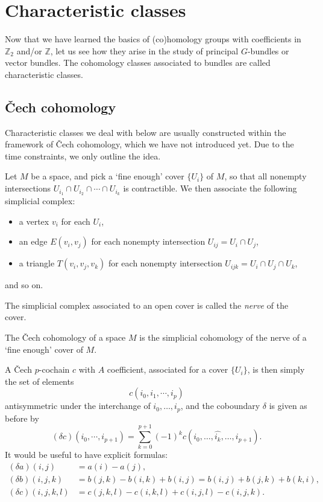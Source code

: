\documentclass[12pt]{article}
\numberwithin{equation}{section}
\theoremstyle{remark}
\def\bZ{\mathbb{Z}}
\begin{document}
\section{Characteristic classes}

Now that we have learned the basics of (co)homology groups with coefficients in $\bZ_2$ and/or $\bZ$,
let us see how they arise in the study of principal $G$-bundles or vector bundles.
The cohomology classes associated to bundles are called characteristic classes.

\subsection{\v Cech cohomology}

Characteristic classes we deal with below are usually constructed within the framework of \v Cech cohomology, 
which we have not introduced yet.
Due to the time constraints, we only outline the idea. 

Let $M$ be a space, and pick a `fine enough' cover $\{U_i\}$ of $M$,
so that all nonempty intersections $U_{i_1} \cap U_{i_2} \cap \cdots \cap U_{i_k}$ is contractible.
We then associate the following simplicial complex:
\begin{itemize}
\item    a vertex $v_i$ for each $U_i$,
\item an edge $E(v_i,v_j)$ for each nonempty intersection $U_{ij}=U_i\cap U_j$,
\item a triangle $T(v_i,v_j,v_k)$ for each nonempty intersection $U_{ijk}=U_i \cap U_j \cap U_k$,
\end{itemize}
and so on. 
\begin{definition}
The simplicial complex associated to an open cover is called the \emph{nerve} of the cover.
\end{definition}

\begin{definition}
The \v Cech cohomology of a space $M$ is the simplicial cohomology 
of the nerve of a `fine enough' cover of $M$.
\end{definition}

A \v Cech $p$-cochain $c$ with $A$ coefficient, associated for a cover $\{U_i\}$,
 is then  simply the set of elements \begin{equation}
 c(i_0,i_1,\cdots, i_p)
\end{equation}
antisymmetric under the interchange of $i_0,\ldots,i_p$,
and the coboundary $\delta$ is given as before by \begin{equation}
(\delta c)(i_0,\cdots, i_{p+1})=\sum_{k=0}^{p+1}(-1)^k c(i_0,\ldots,\widehat{ i_k},\ldots, i_{p+1}).
\end{equation}
It would be useful to have explicit formulas: \begin{align}
(\delta a)(i,j) &= a(i) - a(j),\\
(\delta b)(i,j,k) &= b(j,k) -b(i,k) + b(i,j) = b(i,j) + b(j,k)+ b(k,i),\\
(\delta c)(i,j,k,l) &= c(j,k,l) - c(i,k,l) + c(i,j,l) - c(i,j,k).
\end{align}
\end{document}
